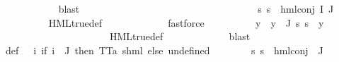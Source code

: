 \begin{isabellebody}
\ \ \ \ \ \ \ \ \ \ \ \ \isamarkupfalse%
\ blast\isanewline
\ \ \ \ \ \ \ \ \isamarkupfalse%
\isanewline
\ \ \ \ \ \ \isamarkupfalse%
\isanewline
\ \ \ \ \ \ \ \ \isamarkupfalse%
\ {}\isanewline
\ \ \ \ \ \ \ \ \isamarkupfalse%
\ {\isachardoublequoteopen}{\isasymforall}s{\isachardot}{\kern0pt}\ {\isasymnot}s\ {\isasymTurnstile}\ {\isacharparenleft}{\kern0pt}hml{\isacharunderscore}{\kern0pt}conj\ I\ J\ {\isasymPhi}{\isacharparenright}{\kern0pt}{\isachardoublequoteclose}\ \isanewline
\ \ \ \ \ \ \ \ \ \ \isamarkupfalse%
\ HML{\isacharunderscore}{\kern0pt}true{\isacharunderscore}{\kern0pt}def\ \isanewline
\ \ \ \ \ \ \ \ \ \ \isamarkupfalse%
\ fastforce\isanewline
\ \ \ \ \ \ \ \ \isamarkupfalse%
\ y\ \ {\isachardoublequoteopen}y\ {\isasymin}\ {\isasymPhi}{\isacharbackquote}{\kern0pt}J{\isachardoublequoteclose}\ {\isachardoublequoteopen}{\isacharparenleft}{\kern0pt}{\isasymforall}s{\isachardot}{\kern0pt}\ s\ {\isasymTurnstile}\ y{\isacharparenright}{\kern0pt}{\isachardoublequoteclose}\ \isanewline
\ \ \ \ \ \ \ \ \ \ \isamarkupfalse%
\ {\isachardoublequoteopen}{}{\isachardoublequoteclose}\isanewline
\ \ \ \ \ \ \ \ \ \ \isamarkupfalse%
\ HML{\isacharunderscore}{\kern0pt}true{\isacharunderscore}{\kern0pt}def\ \isanewline
\ \ \ \ \ \ \ \ \ \ \isamarkupfalse%
\ blast\isanewline
\ \ \ \ \ \ \isamarkupfalse%
\ {\isasymPsi}\ \ {\isasymPsi}{\isacharunderscore}{\kern0pt}def{\isacharcolon}{\kern0pt}\ {\isachardoublequoteopen}{\isasymPsi}\ {\isacharequal}{\kern0pt}\ {\isacharparenleft}{\kern0pt}{\isasymlambda}i{\isachardot}{\kern0pt}\ {\isacharparenleft}{\kern0pt}if\ i\ {\isasymin}\ J\ then\ {\isacharparenleft}{\kern0pt}TT{\isacharcolon}{\kern0pt}{\isacharcolon}{\kern0pt}{\isacharparenleft}{\kern0pt}{\isacharprime}{\kern0pt}a{\isacharcomma}{\kern0pt}\ {\isacharprime}{\kern0pt}s{\isacharparenright}{\kern0pt}hml{\isacharparenright}{\kern0pt}\ else\ undefined{\isacharparenright}{\kern0pt}{\isacharparenright}{\kern0pt}{\isachardoublequoteclose}\isanewline
\ \ \ \ \ \ \isamarkupfalse%
\ {\isachardoublequoteopen}{\isasymforall}s{\isachardot}{\kern0pt}\ {\isasymnot}s\ {\isasymTurnstile}\ {\isacharparenleft}{\kern0pt}hml{\isacharunderscore}{\kern0pt}conj\ {\isacharbraceleft}{\kern0pt}{\isacharbraceright}{\kern0pt}\ J\ {\isasymPsi}{\isacharparenright}{\kern0pt}{\isachardoublequoteclose}\ \isanewline

\end{isabellebody}
